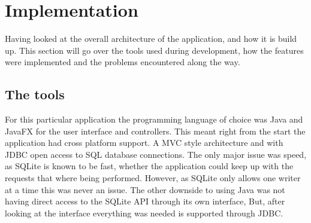 %
%
%
%
%
%

\section{Implementation}
\label{sec:implementation}

Having looked at the overall architecture of the application, and how it is build up. This section will go over the tools used during development, how the features were implemented and the problems encountered along the way.

\subsection{The tools}
\label{subsec:the_tools}

For this particular application the programming language of choice was Java and JavaFX for the user interface and controllers. This meant right from the start the application had cross platform support. A MVC style architecture and with JDBC open access to SQL database connections. The only major issue was speed, as SQLite is known to be fast, whether the application could keep up with the requests that where being performed. However, as SQLite only allows one writer at a time this was never an issue. The other downside to using Java was not having direct access to the SQLite API through its own interface, But, after looking at the interface everything was needed is supported through JDBC.

